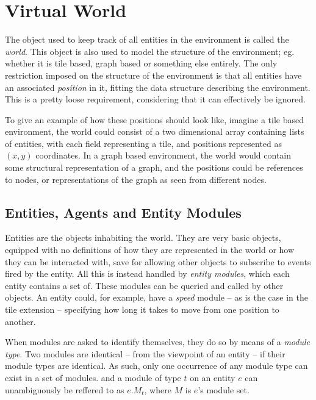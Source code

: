 
\section{Virtual World}

The object used to keep track of all entities in the environment is
called the \emph{world}. This object is also used to model the structure
of the environment; eg. whether it is tile based, graph based or something
else entirely. The only restriction imposed on the structure of the
environment is that all entities have an associated \emph{position}
in it, fitting the data structure describing the environment. This
is a pretty loose requirement, considering that it can effectively
be ignored.

To give an example of how these positions should look like, imagine
a tile based environment, the world could consist of a two dimensional
array containing lists of entities, with each field representing a
tile, and positions represented as $(x,y)$ coordinates. In a graph
based environment, the world would contain some structural representation
of a graph, and the positions could be references to nodes, or representations
of the graph as seen from different nodes.


\subsection{Entities, Agents and Entity Modules\label{sub:SysFeatEntities}}

Entities are the objects inhabiting the world. They are very basic
objects, equipped with no definitions of how they are represented
in the world or how they can be interacted with, save for allowing
other objects to subscribe to events fired by the entity. All this
is instead handled by \emph{entity modules}, which each entity contains
a set of. These modules can be queried and called by other objects.
An entity could, for example, have a \emph{speed} module -- as is
the case in the tile extension -- specifying how long it takes to
move from one position to another.

When modules are asked to identify themselves, they do so by means
of a \emph{module type}. Two modules are identical -- from the viewpoint
of an entity -- if their module types are identical. As such, only
one occurrence of any module type can exist in a set of modules. and
a module of type $t$ on an entity $e$ can unambiguously be reffered
to as $e.M_{t}$, where $M$ is $e$'s module set. 

